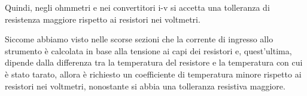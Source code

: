 Quindi, negli ohmmetri e nei convertitori i-v si accetta una tolleranza di resistenza maggiore rispetto ai resistori nei voltmetri. \newline 

Siccome abbiamo visto nelle scorse sezioni che la corrente di ingresso allo strumento è calcolata in base alla tensione ai capi dei resistori 
e, quest'ultima, dipende dalla differenza tra la temperatura del resistore e la temperatura con cui è stato tarato, 
allora è richiesto un coefficiente di temperatura minore rispetto ai resistori nei voltmetri, nonostante si abbia una tolleranza resistiva maggiore. \newline 

\newpage 